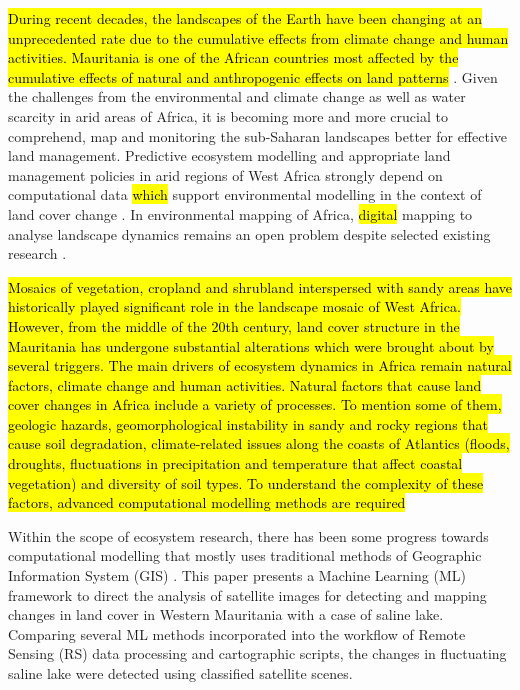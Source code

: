 \documentclass[12pt,a4paper,oneside]{article}
\def \newpar{\vspace{6pt}}
\begin{document}
\newpar \hl{During recent decades, the landscapes of the Earth have been changing at an unprecedented rate due to the cumulative effects from climate change and human activities. Mauritania is one of the African countries most affected by the cumulative effects of natural and anthropogenic effects on land patterns} \citep{CHOPLIN201749}. Given the challenges from the environmental and climate change as well as water scarcity in arid areas of Africa, it is becoming more and more crucial to comprehend, map and monitoring the sub-Saharan landscapes better for effective land management. Predictive ecosystem modelling and appropriate land management policies in arid regions of West Africa strongly depend on computational data \hl{which} support environmental modelling in the context of land cover change \citep{BOJER2024121394,PILLAY2021106595,Lemenkova202414}. In environmental mapping of Africa, \hl{digital} mapping to analyse landscape dynamics remains an open problem despite selected existing research \citep{ALI2024113123,WALTHER2021146093,TWUMASIANKRAH2024176219,Lemenkova202413}. 

\newpar \hl{Mosaics of vegetation, cropland and shrubland interspersed with sandy areas have historically played significant role in the landscape mosaic of West Africa. However, from the middle of the 20th century, land cover structure in the Mauritania has undergone substantial alterations which were brought about by several triggers. The main drivers of ecosystem dynamics in Africa remain natural factors, climate change and human activities. Natural factors that cause land cover changes in Africa include a variety of processes. To mention some of them, geologic hazards, geomorphological instability in sandy and rocky regions that cause soil degradation, climate-related issues along the coasts of Atlantics (floods, droughts, fluctuations in precipitation and temperature that affect coastal vegetation) and diversity of soil types. To understand the complexity of these factors, advanced computational modelling methods are required} 

\newpar Within the scope of ecosystem research, there has been some progress towards computational modelling that mostly uses traditional methods of Geographic Information System (GIS) \citep{DUNGA2024108989,EBRAHIM2024101374,SHOKO2024103796,Lemenkova202412,Holloway}. This paper presents a Machine Learning (ML) framework to direct the analysis of satellite images for detecting and mapping changes in land cover in Western Mauritania with a case of saline lake. Comparing several ML methods incorporated into the workflow of Remote Sensing (RS) data processing and cartographic scripts, the changes in fluctuating saline lake were detected using classified satellite scenes.
\end{document}

